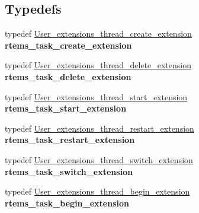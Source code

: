 \subsection*{Typedefs}
\begin{DoxyCompactItemize}
\item 
\mbox{\label{group__ClassicUserExtensions_ga9b49bbd00ea99449a4e4fc9b59c895eb}} 
typedef \mbox{\hyperlink{group__RTEMSScoreUserExt_gaa1841550f1837f2119ce895ad1b06861}{User\+\_\+extensions\+\_\+thread\+\_\+create\+\_\+extension}} {\bfseries rtems\+\_\+task\+\_\+create\+\_\+extension}
\item 
\mbox{\label{group__ClassicUserExtensions_ga96cb5310a1aaccfadbd77f9ccb24c094}} 
typedef \mbox{\hyperlink{group__RTEMSScoreUserExt_gac18e876b733325cf488b33a4a1c94558}{User\+\_\+extensions\+\_\+thread\+\_\+delete\+\_\+extension}} {\bfseries rtems\+\_\+task\+\_\+delete\+\_\+extension}
\item 
\mbox{\label{group__ClassicUserExtensions_gacf732d4291173809fb6dc615d8168be8}} 
typedef \mbox{\hyperlink{group__RTEMSScoreUserExt_ga4924b5a161503c73ac1c894561fdd2b5}{User\+\_\+extensions\+\_\+thread\+\_\+start\+\_\+extension}} {\bfseries rtems\+\_\+task\+\_\+start\+\_\+extension}
\item 
\mbox{\label{group__ClassicUserExtensions_ga5045805dde3cdecf26f7a9245f155703}} 
typedef \mbox{\hyperlink{group__RTEMSScoreUserExt_ga2f53589bea8c67fd0f1fef2d2115479c}{User\+\_\+extensions\+\_\+thread\+\_\+restart\+\_\+extension}} {\bfseries rtems\+\_\+task\+\_\+restart\+\_\+extension}
\item 
\mbox{\label{group__ClassicUserExtensions_ga2e7c0c52b69d46bce338779013b451e0}} 
typedef \mbox{\hyperlink{group__RTEMSScoreUserExt_gac8250042e8749b455941bf4085d09fc5}{User\+\_\+extensions\+\_\+thread\+\_\+switch\+\_\+extension}} {\bfseries rtems\+\_\+task\+\_\+switch\+\_\+extension}
\item 
\mbox{\label{group__ClassicUserExtensions_ga378a249b196ccb591e5a04c757749c9c}} 
typedef \mbox{\hyperlink{group__RTEMSScoreUserExt_ga4beea4d5417558969b343317683ab7c6}{User\+\_\+extensions\+\_\+thread\+\_\+begin\+\_\+extension}} {\bfseries rtems\+\_\+task\+\_\+begin\+\_\+extension}

\end{DoxyCompactItemize}
